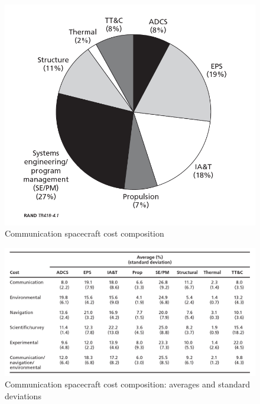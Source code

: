 \documentclass[11pt,a4paper,titlepage]{article}
\begin{document}
		\begin{figure}
			\centering
			\includegraphics[width = .7\textwidth]{Torta.png}
			\caption{Communication spacecraft cost composition}
			\label{fig:torta}
		\end{figure}

		\begin{figure}
			\centering
			\includegraphics[width = 1\textwidth]{Standard_dev.png}
			\caption{Communication spacecraft cost composition: averages and standard deviations}
			\label{fig:distribution}
		\end{figure}
\end{document}
